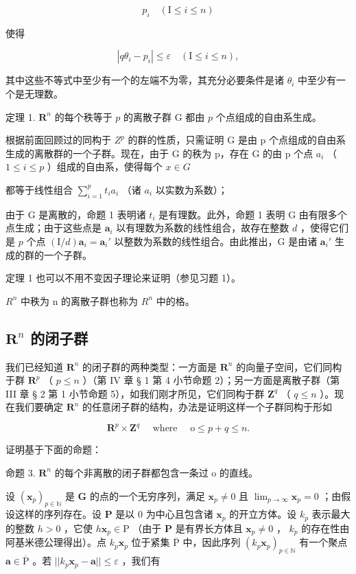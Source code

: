 \[
p _ {i} \quad (\mathrm{I} \leqslant i \leqslant n)
\]

使得

\[
\left| q \theta_ {i} - p _ {i} \right| \leqslant \varepsilon \quad (\mathrm{I} \leqslant i \leqslant n),
\]

其中这些不等式中至少有一个的左端不为零，其充分必要条件是诸 \(\theta_{i}\) 中至少有一个是无理数。

定理 1. \(\mathbf{R}^n\) 的每个秩等于 \(p\) 的离散子群 G 都由 \(p\) 个点组成的自由系生成。

根据前面回顾过的同构于 \(Z^{p}\) 的群的性质，只需证明 G 是由 p 个点组成的自由系生成的离散群的一个子群。现在，由于 G 的秩为 p，存在 G 的由 p 个点 \(a_{i}\) （ \(1 \leqslant i \leqslant p\) ）组成的自由系，使得每个 \(x \in G\)

都等于线性组合 \(\sum_{i=1}^{p} t_i a_i\) （诸 \(a_i\) 以实数为系数）；

由于 G 是离散的，命题 1 表明诸 \(t_i\) 是有理数。此外，命题 1 表明 G 由有限多个点生成；由于这些点是 \(\boldsymbol{a}_i\) 以有理数为系数的线性组合，故存在整数 \(d\) ，使得它们是 \(p\) 个点 \((\mathrm{I}/d)\boldsymbol{a}_i = \boldsymbol{a}_i'\) 以整数为系数的线性组合。由此推出，G 是由诸 \(\boldsymbol{a}_i'\) 生成的群的一个子群。

定理 1 也可以不用不变因子理论来证明（参见习题 1）。

\(R^{n}\) 中秩为 n 的离散子群也称为 \(R^{n}\) 中的格。

\subsection{\texorpdfstring{\(\mathbf{R}^n\) 的闭子群}{R 的 n 次幂的闭子群}}

我们已经知道 \(\mathbf{R}^n\) 的闭子群的两种类型：一方面是 \(\mathbf{R}^n\) 的向量子空间，它们同构于群 \(\mathbf{R}^p\) （ \(p \leqslant n\) ）（第 IV 章 § 1 第 4 小节命题 2）；另一方面是离散子群（第 III 章 § 2 第 1 小节命题 5），如我们刚才所见，它们同构于群 \(\mathbf{Z}^q\) （ \(q \leqslant n\) ）。现在我们要确定 \(\mathbf{R}^n\) 的任意闭子群的结构，办法是证明这样一个子群同构于形如

\[
\mathbf {R} ^ {p} \times \mathbf {Z} ^ {q} \quad \text { where } \quad \mathrm{o} \leqslant p + q \leqslant n.
\]

证明基于下面的命题：

命题 3. \(\mathbf{R}^n\) 的每个非离散的闭子群都包含一条过 o 的直线。

设 \((\pmb{x}_p)_{p\in \mathbb{N}}\) 是 \(\mathbf{G}\) 的点的一个无穷序列，满足 \(\pmb{x}_p\neq 0\) 且 \(\lim_{p\to \infty}\pmb{x}_p = 0\) ；由假设这样的序列存在。设 \(\mathbf{P}\) 是以 \(0\) 为中心且包含诸 \(\pmb{x}_p\) 的开立方体。设 \(k_{p}\) 表示最大的整数 \(h > 0\) ，它使 \(h\pmb{x}_p\in \mathrm{P}\) （由于 \(\mathbf{P}\) 是有界长方体且 \(\pmb{x}_p\neq 0\) ， \(k_{p}\) 的存在性由阿基米德公理得出）。点 \(k_{p}\pmb{x}_{p}\) 位于紧集 \(\overline{\mathrm{P}}\) 中，因此序列 \((k_{p}\pmb{x}_{p})_{p\in \mathbb{N}}\) 有一个聚点 \(\pmb {a}\in \overline{\mathrm{P}}\) 。若 \(||k_p\pmb {x}_p - \pmb {a}||\leqslant \varepsilon\) ，我们有

